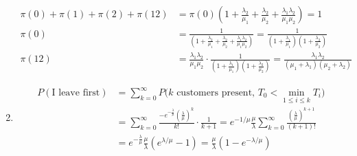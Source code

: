 \documentclass[12pt]{article}
\begin{document}
\begin{enumerate}
    \begin{align}
        \pi(0)+\pi(1)+\pi(2)+\pi(12) &= \pi(0)\left(1 + \frac{\lambda_2}{\mu_1} +  \frac{\lambda_2}{\mu_2} + \frac{\lambda_1\lambda_2}{\mu_1\mu_2}\right) = 1 \nonumber \\
        \pi(0) &= \frac{1}{\left(1 + \frac{\lambda_2}{\mu_1} +  \frac{\lambda_2}{\mu_2} + \frac{\lambda_1\lambda_2}{\mu_1\mu_2}\right)}
        =\frac{1}{\left(1+\frac{\lambda_1}{\mu_1}\right) \left(1+\frac{\lambda_2}{\mu_2}\right)}\nonumber\\
        \pi(12)&=\frac{\lambda_1\lambda_2}{\mu_1\mu_2}\cdot \frac{1}{\left(1+\frac{\lambda_1}{\mu_1}\right) \left(1+\frac{\lambda_2}{\mu_2}\right)}=\frac{\lambda_1\lambda_2}{(\mu_1+\lambda_1)(\mu_2+\lambda_2)} \nonumber
    \end{align}
    
    \item \begin{align}
        P(\text{I leave first}) &= 
        \sum\limits_{k=0}^\infty P(\text{$k$ customers present, $T_0<\min\limits_{1\le i\le k}T_i$)}\nonumber \\
        &=\sum\limits_{k=0}^\infty \frac{-e^{-\frac{\lambda}{\mu}}\left(\frac{\lambda}{\mu}\right)^k}{k!}\cdot \frac{1}{k+1}= e^{-1/\mu}\frac{\mu}{\lambda} \sum\limits_{k=0}^\infty \frac{\left(\frac{\lambda}{\mu}\right)^{k+1}}{(k+1)!}  \nonumber \\
        &=e^{-\frac{\lambda}{\mu}} \frac{\mu}{\lambda} \left(e^{\lambda/\mu}-1\right) = \frac{\mu}{\lambda}\left(1-e^{-\lambda/\mu}\right) \nonumber
    \end{align}
\end{enumerate}
\end{document}

